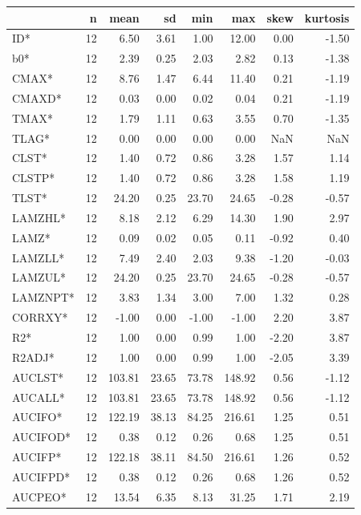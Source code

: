 \documentclass[
  10pt,
]{krantz}
\begin{document}
\begin{tabular}{l|r|r|r|r|r|r|r}
\hline
  & n & mean & sd & min & max & skew & kurtosis\\
\hline
ID* & 12 & 6.50 & 3.61 & 1.00 & 12.00 & 0.00 & -1.50\\
\hline
b0* & 12 & 2.39 & 0.25 & 2.03 & 2.82 & 0.13 & -1.38\\
\hline
CMAX* & 12 & 8.76 & 1.47 & 6.44 & 11.40 & 0.21 & -1.19\\
\hline
CMAXD* & 12 & 0.03 & 0.00 & 0.02 & 0.04 & 0.21 & -1.19\\
\hline
TMAX* & 12 & 1.79 & 1.11 & 0.63 & 3.55 & 0.70 & -1.35\\
\hline
TLAG* & 12 & 0.00 & 0.00 & 0.00 & 0.00 & NaN & NaN\\
\hline
CLST* & 12 & 1.40 & 0.72 & 0.86 & 3.28 & 1.57 & 1.14\\
\hline
CLSTP* & 12 & 1.40 & 0.72 & 0.86 & 3.28 & 1.58 & 1.19\\
\hline
TLST* & 12 & 24.20 & 0.25 & 23.70 & 24.65 & -0.28 & -0.57\\
\hline
LAMZHL* & 12 & 8.18 & 2.12 & 6.29 & 14.30 & 1.90 & 2.97\\
\hline
LAMZ* & 12 & 0.09 & 0.02 & 0.05 & 0.11 & -0.92 & 0.40\\
\hline
LAMZLL* & 12 & 7.49 & 2.40 & 2.03 & 9.38 & -1.20 & -0.03\\
\hline
LAMZUL* & 12 & 24.20 & 0.25 & 23.70 & 24.65 & -0.28 & -0.57\\
\hline
LAMZNPT* & 12 & 3.83 & 1.34 & 3.00 & 7.00 & 1.32 & 0.28\\
\hline
CORRXY* & 12 & -1.00 & 0.00 & -1.00 & -1.00 & 2.20 & 3.87\\
\hline
R2* & 12 & 1.00 & 0.00 & 0.99 & 1.00 & -2.20 & 3.87\\
\hline
R2ADJ* & 12 & 1.00 & 0.00 & 0.99 & 1.00 & -2.05 & 3.39\\
\hline
AUCLST* & 12 & 103.81 & 23.65 & 73.78 & 148.92 & 0.56 & -1.12\\
\hline
AUCALL* & 12 & 103.81 & 23.65 & 73.78 & 148.92 & 0.56 & -1.12\\
\hline
AUCIFO* & 12 & 122.19 & 38.13 & 84.25 & 216.61 & 1.25 & 0.51\\
\hline
AUCIFOD* & 12 & 0.38 & 0.12 & 0.26 & 0.68 & 1.25 & 0.51\\
\hline
AUCIFP* & 12 & 122.18 & 38.11 & 84.50 & 216.61 & 1.26 & 0.52\\
\hline
AUCIFPD* & 12 & 0.38 & 0.12 & 0.26 & 0.68 & 1.26 & 0.52\\
\hline
AUCPEO* & 12 & 13.54 & 6.35 & 8.13 & 31.25 & 1.71 & 2.19\\

\end{tabular}
\end{document}
